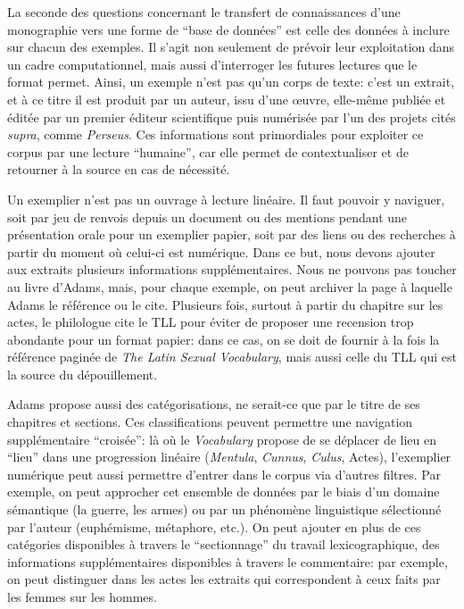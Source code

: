 La seconde des questions concernant le transfert de connaissances d'une monographie vers une forme de \enquote{base de données} est celle des données à inclure sur chacun des exemples. Il s'agit non seulement de prévoir leur exploitation dans un cadre computationnel, mais aussi d'interroger les futures lectures que le format permet. Ainsi, un exemple n'est pas qu'un corps de texte: c'est un extrait, et à ce titre il est produit par un auteur, issu d'une œuvre, elle-même publiée et éditée par un premier éditeur scientifique puis numérisée par l'un des projets cités \textit{supra}, comme \textit{Perseus}. Ces informations sont primordiales pour exploiter ce corpus par une lecture \enquote{humaine}, car elle permet de contextualiser et de retourner à la source en cas de nécessité. 

Un exemplier n'est pas un ouvrage à lecture linéaire. Il faut pouvoir y naviguer, soit par jeu de renvois depuis un document ou des mentions pendant une présentation orale pour un exemplier papier, soit par des liens ou des recherches à partir du moment où celui-ci est numérique. Dans ce but, nous devons ajouter aux extraits plusieurs informations supplémentaires. Nous ne pouvons pas toucher au livre d'Adams, mais, pour chaque exemple, on peut archiver la page à laquelle Adams le référence ou le cite. Plusieurs fois, surtout à partir du chapitre sur les actes, le philologue cite le TLL pour éviter de proposer une recension trop abondante pour un format papier: dans ce cas, on se doit de fournir à la fois la référence paginée de \textit{The Latin Sexual Vocabulary}, mais aussi celle du TLL qui est la source du dépouillement.

Adams propose aussi des catégorisations, ne serait-ce que par le titre de ses chapitres et sections. Ces classifications peuvent permettre une navigation supplémentaire \enquote{croisée}: là où le \textit{Vocabulary} propose de se déplacer de lieu en \enquote{lieu} dans une progression linéaire (\textit{Mentula}, \textit{Cunnus}, \textit{Culus}, Actes), l'exemplier numérique peut aussi permettre d'entrer dans le corpus via d'autres filtres. Par exemple, on peut approcher cet ensemble de données par le biais d'un domaine sémantique (la guerre, les armes) ou par un phénomène linguistique sélectionné par l'auteur (euphémisme, métaphore, etc.). On peut ajouter en plus de ces catégories disponibles à travers le \enquote{sectionnage} du travail lexicographique, des informations supplémentaires disponibles à travers le commentaire: par exemple, on peut distinguer dans les actes les extraits qui correspondent à ceux faits par les femmes sur les hommes.

